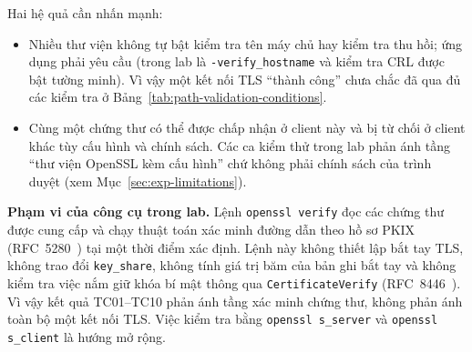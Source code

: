 Hai hệ quả cần nhấn mạnh:
\begin{itemize}
    \item Nhiều thư viện không tự bật kiểm tra tên máy chủ hay kiểm tra thu hồi; ứng dụng phải yêu cầu (trong lab là \texttt{-verify\_hostname} và kiểm tra CRL được bật tường minh). Vì vậy một kết nối TLS ``thành công'' chưa chắc đã qua đủ các kiểm tra ở Bảng~\ref{tab:path-validation-conditions}.
    \item Cùng một chứng thư có thể được chấp nhận ở client này và bị từ chối ở client khác tùy cấu hình và chính sách. Các ca kiểm thử trong lab phản ánh tầng ``thư viện OpenSSL kèm cấu hình'' chứ không phải chính sách của trình duyệt (xem Mục~\ref{sec:exp-limitations}).
\end{itemize}

\noindent\textbf{Phạm vi của công cụ trong lab.} Lệnh \texttt{openssl verify} đọc các chứng thư được cung cấp và chạy thuật toán xác minh đường dẫn theo hồ sơ PKIX (RFC~5280~\cite{rfc5280}) tại một thời điểm xác định. Lệnh này không thiết lập bắt tay TLS, không trao đổi \texttt{key\_share}, không tính giá trị băm của bản ghi bắt tay và không kiểm tra việc nắm giữ khóa bí mật thông qua \texttt{CertificateVerify} (RFC~8446~\cite{rfc8446}). Vì vậy kết quả TC01--TC10 phản ánh tầng xác minh chứng thư, không phản ánh toàn bộ một kết nối TLS. Việc kiểm tra bằng \texttt{openssl s\_server} và \texttt{openssl s\_client} là hướng mở rộng.
